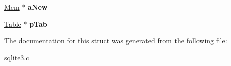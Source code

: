 \begin{DoxyCompactItemize}
\item 
\hyperlink{structMem}{Mem} $\ast$ {\bfseries a\+New}\hypertarget{structPreUpdate_a3d8862bac16113aeb528b1aeafe4f118}{}\label{structPreUpdate_a3d8862bac16113aeb528b1aeafe4f118}

\item 
\hyperlink{structTable}{Table} $\ast$ {\bfseries p\+Tab}\hypertarget{structPreUpdate_a6e7848e9ef889f2dc47f68a5a2a0ed4a}{}\label{structPreUpdate_a6e7848e9ef889f2dc47f68a5a2a0ed4a}

\end{DoxyCompactItemize}


The documentation for this struct was generated from the following file\+:\begin{DoxyCompactItemize}
\item 
sqlite3.\+c\end{DoxyCompactItemize}
